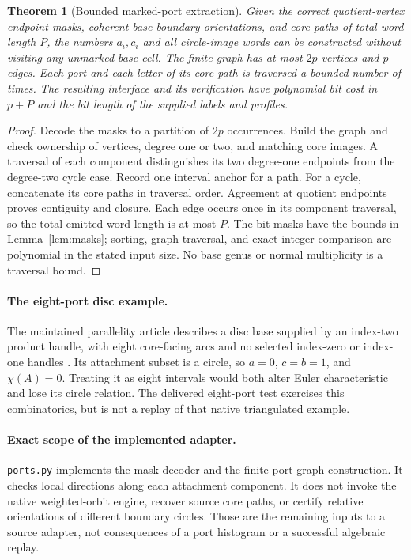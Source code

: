 \documentclass[11pt]{article}
\newtheorem{theorem}{Theorem}[section]
\theoremstyle{definition}
\theoremstyle{remark}
\newcommand{\code}[1]{\texttt{#1}}
\begin{document}
\begin{theorem}[Bounded marked-port extraction]
\label{thm:ports}
Given the correct quotient-vertex endpoint masks, coherent base-boundary
orientations, and core paths of total word length $P$, the numbers $a_i,c_i$
and all circle-image words can be constructed without visiting any unmarked
base cell. The finite graph has at most $2p$ vertices and $p$ edges. Each port
and each letter of its core path is traversed a bounded number of times.
The resulting interface and its verification have polynomial bit cost in
$p+P$ and the bit length of the supplied labels and profiles.
\end{theorem}
\begin{proof}
Decode the masks to a partition of $2p$ occurrences. Build the graph and
check ownership of vertices, degree one or two, and matching core images.
A traversal of each component distinguishes its two degree-one endpoints
from the degree-two cycle case. Record one interval anchor for a path.
For a cycle, concatenate its core paths in traversal order. Agreement at
quotient endpoints proves contiguity and closure. Each edge occurs once in
its component traversal, so the total emitted word length is at most $P$.
The bit masks have the bounds in Lemma~\ref{lem:masks}; sorting, graph
traversal, and exact integer comparison are polynomial in the stated input
size. No base genus or normal multiplicity is a traversal bound.
\end{proof}

\paragraph{The eight-port disc example.}
The maintained parallelity article describes a disc base supplied by an
index-two product handle, with eight core-facing arcs and no selected
index-zero or index-one handles \cite{repo-parallelity}. Its attachment
subset is a circle, so $a=0$, $c=b=1$, and $\chi(A)=0$. Treating it as eight
intervals would both alter Euler characteristic and lose its circle relation.
The delivered eight-port test exercises this combinatorics, but is not a
replay of that native triangulated example.

\paragraph{Exact scope of the implemented adapter.}
\code{ports.py} implements the mask decoder and the finite port graph
construction. It checks local directions along each attachment component.
It does not invoke the native weighted-orbit engine, recover source core
paths, or certify relative orientations of different boundary circles.
Those are the remaining inputs to a source adapter, not consequences of a
port histogram or a successful algebraic replay.
\end{document}
